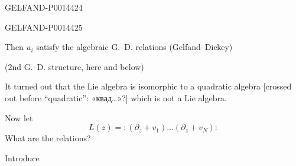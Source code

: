 \begin{GelfandAdjacentEvidence}{GELFAND-P001442}{4}

\end{GelfandAdjacentEvidence}
\begin{GelfandAdjacentEvidence}{GELFAND-P001442}{5}


Then \(u_i\) satisfy the algebraic G.–D. relations (Gelfand–Dickey)

(2nd G.–D. structure, here and below)

It turned out that the Lie algebra is isomorphic to a quadratic algebra [crossed out before “quadratic”: «квад…»?] which is not a Lie algebra.
\end{GelfandAdjacentEvidence}


Now let
\begin{equation*}
L(z)={:}(\partial_z+v_1)\ldots(\partial_z+v_N){:} \tag{22}
\end{equation*}
What are the relations?

Introduce


